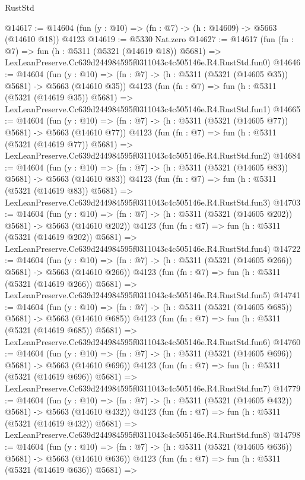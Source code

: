\begin{lexlean}{RustStd}
\begin{coremodule}
@14617 := @14604 (fun (y : @10) => (fn : @7) -> (h : @14609) -> @5663 (@14610 @18)) @4123
@14619 := @5330 Nat.zero
@14627 := @14617
    (fun (fn : @7) =>
    fun (h : @5311 (@5321 (@14619 @18)) @5681) =>
    LexLeanPreserve.Cc639d244984595f0311043c4c505146e.R4.RustStd.fun0)
@14646 := @14604
    (fun (y : @10) => (fn : @7) -> (h : @5311 (@5321 (@14605 @35)) @5681) -> @5663 (@14610 @35))
    @4123
    (fun (fn : @7) =>
    fun (h : @5311 (@5321 (@14619 @35)) @5681) =>
    LexLeanPreserve.Cc639d244984595f0311043c4c505146e.R4.RustStd.fun1)
@14665 := @14604
    (fun (y : @10) => (fn : @7) -> (h : @5311 (@5321 (@14605 @77)) @5681) -> @5663 (@14610 @77))
    @4123
    (fun (fn : @7) =>
    fun (h : @5311 (@5321 (@14619 @77)) @5681) =>
    LexLeanPreserve.Cc639d244984595f0311043c4c505146e.R4.RustStd.fun2)
@14684 := @14604
    (fun (y : @10) => (fn : @7) -> (h : @5311 (@5321 (@14605 @83)) @5681) -> @5663 (@14610 @83))
    @4123
    (fun (fn : @7) =>
    fun (h : @5311 (@5321 (@14619 @83)) @5681) =>
    LexLeanPreserve.Cc639d244984595f0311043c4c505146e.R4.RustStd.fun3)
@14703 := @14604
    (fun (y : @10) => (fn : @7) -> (h : @5311 (@5321 (@14605 @202)) @5681) -> @5663 (@14610 @202))
    @4123
    (fun (fn : @7) =>
    fun (h : @5311 (@5321 (@14619 @202)) @5681) =>
    LexLeanPreserve.Cc639d244984595f0311043c4c505146e.R4.RustStd.fun4)
@14722 := @14604
    (fun (y : @10) => (fn : @7) -> (h : @5311 (@5321 (@14605 @266)) @5681) -> @5663 (@14610 @266))
    @4123
    (fun (fn : @7) =>
    fun (h : @5311 (@5321 (@14619 @266)) @5681) =>
    LexLeanPreserve.Cc639d244984595f0311043c4c505146e.R4.RustStd.fun5)
@14741 := @14604
    (fun (y : @10) => (fn : @7) -> (h : @5311 (@5321 (@14605 @685)) @5681) -> @5663 (@14610 @685))
    @4123
    (fun (fn : @7) =>
    fun (h : @5311 (@5321 (@14619 @685)) @5681) =>
    LexLeanPreserve.Cc639d244984595f0311043c4c505146e.R4.RustStd.fun6)
@14760 := @14604
    (fun (y : @10) => (fn : @7) -> (h : @5311 (@5321 (@14605 @696)) @5681) -> @5663 (@14610 @696))
    @4123
    (fun (fn : @7) =>
    fun (h : @5311 (@5321 (@14619 @696)) @5681) =>
    LexLeanPreserve.Cc639d244984595f0311043c4c505146e.R4.RustStd.fun7)
@14779 := @14604
    (fun (y : @10) => (fn : @7) -> (h : @5311 (@5321 (@14605 @432)) @5681) -> @5663 (@14610 @432))
    @4123
    (fun (fn : @7) =>
    fun (h : @5311 (@5321 (@14619 @432)) @5681) =>
    LexLeanPreserve.Cc639d244984595f0311043c4c505146e.R4.RustStd.fun8)
@14798 := @14604
    (fun (y : @10) => (fn : @7) -> (h : @5311 (@5321 (@14605 @636)) @5681) -> @5663 (@14610 @636))
    @4123
    (fun (fn : @7) =>
    fun (h : @5311 (@5321 (@14619 @636)) @5681) =>

\end{coremodule}
\end{lexlean}
